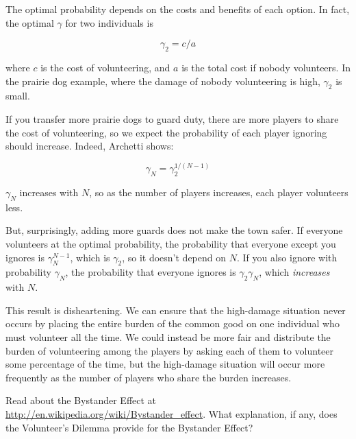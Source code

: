 \documentclass[10pt]{book}
\begin{document}
The optimal
probability depends on the costs and benefits of each
option.  In fact, the optimal $\gamma$ for two individuals is

\[ \gamma_2 = c/a \]

where $c$ is the cost of volunteering, and $a$ is the total cost
if nobody volunteers.  In
the prairie dog example, where the damage of nobody volunteering is
high, $\gamma_2$ is small.

If you transfer more prairie dogs to guard duty, there are more
players to share the cost of volunteering, so we expect the
probability of each player ignoring should increase.  Indeed, Archetti
shows:

\[ \gamma_N = \gamma_2^{1/(N-1)} \]

$\gamma_N$ increases with
$N$, so as the number of players increases, each player volunteers
less.

But, surprisingly, adding more guards does not make the town safer.
If everyone volunteers at the optimal probability, the probability that
everyone except you ignores is $\gamma_N^{N-1}$, which is $\gamma_2$, so
it doesn't depend on $N$.  If you also ignore with probability $\gamma_N$,
the probability that everyone ignores is $\gamma_2 \gamma_N$, which
\emph{increases} with $N$.

This result is disheartening.  We can ensure that the high-damage
situation never occurs by placing the entire burden of the common good
on one individual who must volunteer all the time.  We could instead
be more fair and distribute the burden of volunteering among the
players by asking each of them to volunteer some percentage of the
time, but the high-damage situation will occur more frequently as the
number of players who share the burden increases.

\begin{exercise}

Read about the Bystander Effect at
\url{http://en.wikipedia.org/wiki/Bystander_effect}.  What
explanation, if any, does the Volunteer's Dilemma provide for the
Bystander Effect?

\end{exercise}
\end{document}
